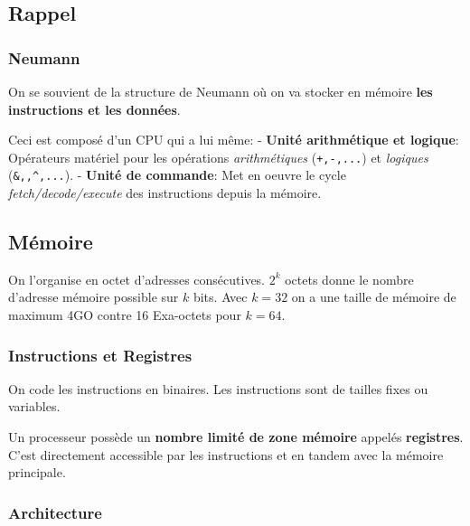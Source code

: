 \subsection{Rappel}\label{rappel}

\subsubsection{Neumann}\label{neumann}

On se souvient de la structure de Neumann où on va stocker en mémoire
\textbf{les instructions et les données}.

Ceci est composé d'un CPU qui a lui même: - \textbf{Unité arithmétique
et logique}: Opérateurs matériel pour les opérations
\emph{arithmétiques} (\texttt{+,-,...}) et \emph{logiques}
(\texttt{\&,\textbar{},\^{},...}). - \textbf{Unité de commande}: Met en
oeuvre le cycle \emph{fetch/decode/execute} des instructions depuis la
mémoire.

\subsection{Mémoire}\label{muxe9moire}

On l'organise en octet d'adresses consécutives. \(2^k\) octets donne le
nombre d'adresse mémoire possible sur \(k\) bits. Avec \(k=32\) on a une
taille de mémoire de maximum 4GO contre 16 Exa-octets pour \(k=64\).

\subsubsection{Instructions et
Registres}\label{instructions-et-registres}

On code les instructions en binaires. Les instructions sont de tailles
fixes ou variables.

Un processeur possède un \textbf{nombre limité de zone mémoire} appelés
\textbf{registres}. C'est directement accessible par les instructions et
en tandem avec la mémoire principale.

\subsubsection{Architecture}\label{architecture}

